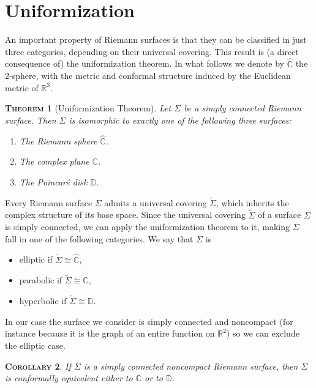 \documentclass[a4paper,11pt,openright,twoside]{book}
\newcommand{\R}{\mathbb{R}}
\newcommand{\C}{\mathbb{C}}
\newcommand{\1}{\mathds{1}}
\theoremstyle{plain}
\newtheorem{thm}{\textsc{Theorem}}[chapter]
\newtheorem{cor}[thm]{\textsc{Corollary}}
\theoremstyle{definition}
\theoremstyle{remark}
\begin{document}
\section{Uniformization}
An important property of Riemann surfaces is that they can be classified in just three categories, depending on their universal covering. This result is  (a direct consequence of) the uniformization theorem.
In what follows we denote by $\widehat{\C}$ the 2-sphere, with the metric and conformal structure induced by the Euclidean metric of $\R^3$.
\begin{thm}[Uniformization Theorem]
	Let $\Sigma$ be a simply connected Riemann surface. Then $\Sigma$ is isomorphic to exactly one of the following three surfaces:
	\begin{enumerate}
		\item The Riemann sphere $\widehat{\C}$.
		\item The complex plane $\C$.
		\item The Poincaré disk $\mathbb{D}$.
	\end{enumerate} 
\end{thm}
Every Riemann surface $\Sigma$ admits a universal covering $\tilde \Sigma$, which inherits the complex structure of its base space. Since the universal covering $\tilde \Sigma$ of a surface $\Sigma$ is simply connected, we can apply the uniformization theorem to it, making $\Sigma$ fall in one of the following categories. We say that $\Sigma$ is
\begin{itemize}[noitemsep]
	\item elliptic if $\widetilde \Sigma \cong \widehat{\C}$,
	\item parabolic if $\widetilde \Sigma \cong \C$,
	\item hyperbolic if $\widetilde \Sigma \cong \mathbb{D}$.
\end{itemize}
In our case the surface we consider is simply connected and noncompact (for instance because it is the graph of an entire function on $\R^2$) so we can exclude the elliptic case.  
\begin{cor}
	If $\Sigma$ is a simply connected noncompact Riemann surface, then $\Sigma$ is conformally equivalent either to $\C$ or to $\mathbb{D}$.
\end{cor}
\end{document}
